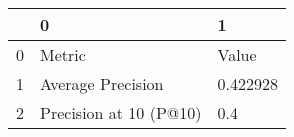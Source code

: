 \begin{tabular}{lll}
\toprule
{} &                       0 &         1 \\
\midrule
0 &                  Metric &     Value \\
1 &       Average Precision &  0.422928 \\
2 &  Precision at 10 (P@10) &       0.4 \\
\bottomrule
\end{tabular}
